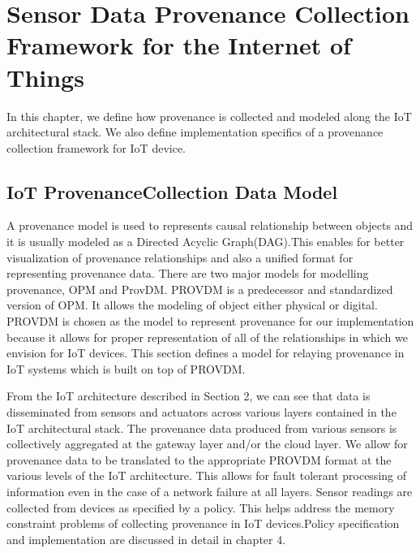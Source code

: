 
\chapter{Sensor Data Provenance Collection Framework for the Internet of Things}

In this chapter, we  define how provenance is collected and modeled along the IoT architectural stack. We also define implementation specifics of a provenance collection framework for IoT device. 

\section{IoT Provenance\-Collection Data Model}
%

A provenance model is used to represents causal relationship between objects and it is usually modeled as a Directed Acyclic Graph(DAG).This enables for better visualization of provenance relationships and also a unified format for representing provenance data. There are two major models for modelling provenance, OPM and Prov\-DM. PROV\-DM is a predecessor and standardized version of OPM. It allows the modeling of object either physical or digital. PROV\-DM is chosen as the model to represent provenance for our implementation because it allows for proper representation of all of the relationships in which we envision for IoT devices. This section defines a model for relaying provenance in IoT systems which is built on top of PROV\-DM. 







From the IoT architecture described in Section 2, we can see that data is disseminated from sensors and actuators across various layers contained in the IoT architectural stack. The provenance data produced from various sensors is collectively aggregated at the gateway layer and/or the cloud layer. We allow for provenance data to be translated to the appropriate PROV\-DM format at the various levels of the IoT architecture. This allows for fault tolerant processing of information even in the case of a network failure at all layers.
Sensor readings are collected from devices as specified by a policy. This helps address the memory constraint problems of collecting provenance in IoT devices.Policy specification and implementation  are discussed in detail in chapter 4. 



